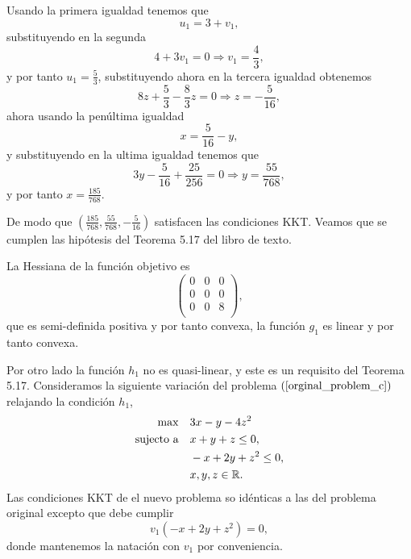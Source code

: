 Usando la primera igualdad tenemos que
\begin{equation*}
    u_1 = 3 + v_1,
\end{equation*}
substituyendo en la segunda
\begin{equation*}
    4 + 3 v_1 = 0 \Rightarrow v_1 = \frac{4}{3},
\end{equation*}
y por tanto $u_1 = \frac{5}{3}$,
substituyendo ahora en la tercera igualdad obtenemos
\begin{equation*}
    8 z + \frac{5}{3} - \frac{8}{3} z = 0 \Rightarrow z = - \frac{5}{16},
\end{equation*}
ahora usando la penúltima igualdad
\begin{equation*}
    x = \frac{5}{16} - y,
\end{equation*}
y substituyendo en la ultima igualdad tenemos que
\begin{equation*}
    3 y - \frac{5}{16} + \frac{25}{256} = 0 \Rightarrow y = \frac{55}{768},
\end{equation*}
y por tanto $x = \frac{185}{768}$.

De modo que $(\frac{185}{768}, \frac{55}{768}, -\frac{5}{16})$ satisfacen las condiciones KKT.
Veamos que se cumplen las hipótesis del Teorema 5.17 del libro de texto.

La Hessiana de la función objetivo es
\begin{equation*}
    \begin{pmatrix}
        0 & 0 & 0 \\
        0 & 0 & 0 \\
        0 & 0 & 8 \\
    \end{pmatrix},
\end{equation*}
que es semi-definida positiva y por tanto convexa,
la función $g_1$ es linear y por tanto convexa.

Por otro lado la función $h_1$ no es quasi-linear, y este es un requisito del Teorema 5.17.
Consideramos la siguiente variación del problema $(\ref{orginal_problem_c})$ relajando la condición $h_1$,
\begin{equation} \label{new_problem_c}
\begin{aligned}
    \max \quad & 3 x - y - 4 z^2 \\
    \text{sujecto a} \quad & x + y + z \leq 0, \\
        & -x + 2y + z^2 \leq 0, \\
        & x, y, z \in \mathbb{R}.
\end{aligned}
\end{equation}
Las condiciones KKT de el nuevo problema so idénticas a las del problema original excepto que debe cumplir
\begin{equation*}
    v_1 (-x + 2y + z^2) = 0,
\end{equation*}
donde mantenemos la natación con $v_1$ por conveniencia.

